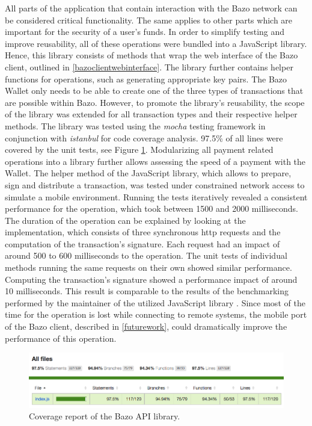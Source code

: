 All parts of the application that contain interaction with the Bazo network can be considered critical functionality. The same applies to other parts which are important for the security of a user's funds. In order to simplify testing and improve reusability, all of these operations were bundled into a JavaScript library. Hence, this library consists of methods that wrap the web interface of the Bazo client, outlined in \ref{bazoclientwebinterface}. The library further contains helper functions for operations, such as generating appropriate key pairs. The Bazo Wallet only needs to be able to create one of the three types of transactions that are possible within Bazo. However, to promote the library's reusability, the scope of the library was extended for all transaction types and their respective helper methods.
The library was tested using the \textit{mocha} testing framework in conjunction with \textit{istanbul} for code coverage analysis. 97.5\% of all lines were covered by the unit tests, see Figure \ref{fig:coverage}. Modularizing all payment related operations into a library further allows assessing the speed of a payment with the Wallet. The helper method of the JavaScript library, which allows to prepare, sign and distribute a transaction, was tested under constrained network access to simulate a mobile environment. Running the tests iteratively revealed a consistent performance for the operation, which took between 1500 and 2000 milliseconds. The duration of the operation can be explained by looking at the implementation, which consists of three synchronous http requests and the computation of the transaction's signature. Each request had an impact of around 500 to 600 milliseconds to the operation. The unit tests of individual methods running the same requests on their own showed similar performance. Computing the transaction's signature showed a performance impact of around 10 milliseconds. This result is comparable to the results of the benchmarking performed by the maintainer of the utilized JavaScript library \cite{elliptic}. 
Since most of the time for the operation is lost while connecting to remote systems, the mobile port of the Bazo client, described in \ref{futurework}, could dramatically improve the performance of this operation.

\begin{figure}
\centering
\includegraphics[width=1\textwidth]{screenshots/bazo-api-testing.png}
\caption{\label{fig:coverage}Coverage report of the Bazo API library.}
\end{figure}

